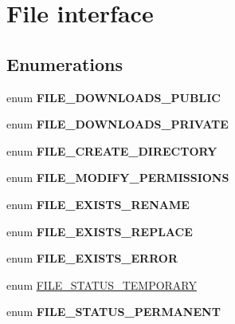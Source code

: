 \hypertarget{group__file}{
\section{File interface}
\label{group__file}
}
\subsection*{Enumerations}
\begin{CompactItemize}
\item 
enum \textbf{FILE\_\-DOWNLOADS\_\-PUBLIC} 
\item 
enum \textbf{FILE\_\-DOWNLOADS\_\-PRIVATE} 
\item 
enum \textbf{FILE\_\-CREATE\_\-DIRECTORY} 
\item 
enum \textbf{FILE\_\-MODIFY\_\-PERMISSIONS} 
\item 
enum \textbf{FILE\_\-EXISTS\_\-RENAME} 
\item 
enum \textbf{FILE\_\-EXISTS\_\-REPLACE} 
\item 
enum \textbf{FILE\_\-EXISTS\_\-ERROR} 
\item 
enum \hyperlink{group__file_g436af683744d1fefcd6da3d694633d19}{FILE\_\-STATUS\_\-TEMPORARY} 
\item 
enum \textbf{FILE\_\-STATUS\_\-PERMANENT} 
\end{CompactItemize}
